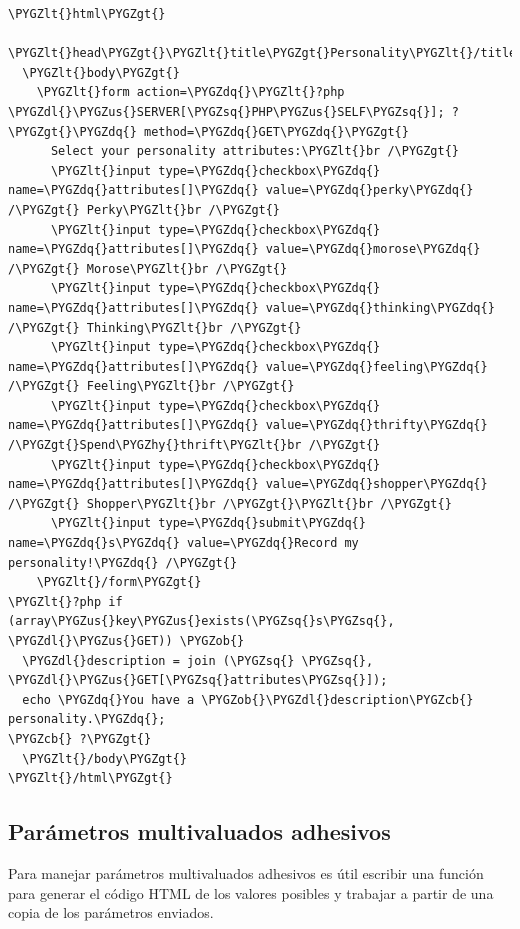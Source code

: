\documentclass[a5paper,10pt,spanish]{sphinxmanual}
\def\PYGZus{\char`\_}
\def\PYGZob{\char`\{}
\def\PYGZcb{\char`\}}
\def\PYGZlt{\char`\<}
\def\PYGZgt{\char`\>}
\def\PYGZdl{\char`\$}
\def\PYGZhy{\char`\-}
\def\PYGZsq{\char`\'}
\def\PYGZdq{\char`\"}
\begin{document}
\begin{Verbatim}[commandchars=\\\{\}]
\PYGZlt{}html\PYGZgt{}
  \PYGZlt{}head\PYGZgt{}\PYGZlt{}title\PYGZgt{}Personality\PYGZlt{}/title\PYGZgt{}\PYGZlt{}/head\PYGZgt{}
  \PYGZlt{}body\PYGZgt{}
    \PYGZlt{}form action=\PYGZdq{}\PYGZlt{}?php \PYGZdl{}\PYGZus{}SERVER[\PYGZsq{}PHP\PYGZus{}SELF\PYGZsq{}]; ?\PYGZgt{}\PYGZdq{} method=\PYGZdq{}GET\PYGZdq{}\PYGZgt{}
      Select your personality attributes:\PYGZlt{}br /\PYGZgt{}
      \PYGZlt{}input type=\PYGZdq{}checkbox\PYGZdq{} name=\PYGZdq{}attributes[]\PYGZdq{} value=\PYGZdq{}perky\PYGZdq{} /\PYGZgt{} Perky\PYGZlt{}br /\PYGZgt{}
      \PYGZlt{}input type=\PYGZdq{}checkbox\PYGZdq{} name=\PYGZdq{}attributes[]\PYGZdq{} value=\PYGZdq{}morose\PYGZdq{} /\PYGZgt{} Morose\PYGZlt{}br /\PYGZgt{}
      \PYGZlt{}input type=\PYGZdq{}checkbox\PYGZdq{} name=\PYGZdq{}attributes[]\PYGZdq{} value=\PYGZdq{}thinking\PYGZdq{} /\PYGZgt{} Thinking\PYGZlt{}br /\PYGZgt{}
      \PYGZlt{}input type=\PYGZdq{}checkbox\PYGZdq{} name=\PYGZdq{}attributes[]\PYGZdq{} value=\PYGZdq{}feeling\PYGZdq{} /\PYGZgt{} Feeling\PYGZlt{}br /\PYGZgt{}
      \PYGZlt{}input type=\PYGZdq{}checkbox\PYGZdq{} name=\PYGZdq{}attributes[]\PYGZdq{} value=\PYGZdq{}thrifty\PYGZdq{} /\PYGZgt{}Spend\PYGZhy{}thrift\PYGZlt{}br /\PYGZgt{}
      \PYGZlt{}input type=\PYGZdq{}checkbox\PYGZdq{} name=\PYGZdq{}attributes[]\PYGZdq{} value=\PYGZdq{}shopper\PYGZdq{} /\PYGZgt{} Shopper\PYGZlt{}br /\PYGZgt{}\PYGZlt{}br /\PYGZgt{}
      \PYGZlt{}input type=\PYGZdq{}submit\PYGZdq{} name=\PYGZdq{}s\PYGZdq{} value=\PYGZdq{}Record my personality!\PYGZdq{} /\PYGZgt{}
    \PYGZlt{}/form\PYGZgt{}
\PYGZlt{}?php if (array\PYGZus{}key\PYGZus{}exists(\PYGZsq{}s\PYGZsq{}, \PYGZdl{}\PYGZus{}GET)) \PYGZob{}
  \PYGZdl{}description = join (\PYGZsq{} \PYGZsq{}, \PYGZdl{}\PYGZus{}GET[\PYGZsq{}attributes\PYGZsq{}]);
  echo \PYGZdq{}You have a \PYGZob{}\PYGZdl{}description\PYGZcb{} personality.\PYGZdq{};
\PYGZcb{} ?\PYGZgt{}
  \PYGZlt{}/body\PYGZgt{}
\PYGZlt{}/html\PYGZgt{}
\end{Verbatim}


\subsection{Parámetros multivaluados adhesivos}
\label{Tutorial2_Formularios.md:parametros-multivaluados-adhesivos}
Para manejar parámetros multivaluados adhesivos es útil escribir una
función para generar el código HTML de los valores posibles y trabajar a
partir de una copia de los parámetros enviados.
\end{document}
